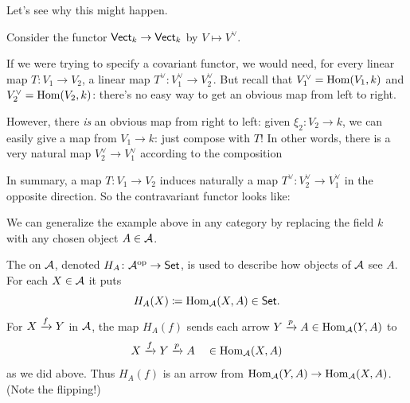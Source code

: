 Let's see why this might happen.
\begin{example}
	Consider the functor $\catname{Vect}_k \to \catname{Vect}_k$ by $V \mapsto V^\vee$.

	If we were trying to specify a covariant functor,
	we would need, for every linear map $T \colon V_1 \to V_2$,
	a linear map $T^\vee \colon V_1^\vee \to V_2^\vee$.
	But recall that $V_1^\vee = \Hom(V_1, k)$ and $V_2^\vee = \Hom(V_2, k)$:
	there's no easy way to get an obvious map from left to right.

	However, there \emph{is} an obvious map from right to left:
	given $\xi_2 \colon V_2 \to k$, we can easily give a map from $V_1 \to k$:
	just compose with $T$!
	In other words, there is a very natural map $V_2^\vee \to V_1^\vee$
	according to the composition
	\begin{center}
	\end{center}
	In summary, a map $T \colon V_1 \to V_2$ induces naturally a map
	$T^\vee \colon V_2^\vee \to V_1^\vee$ in the opposite direction.
	So the contravariant functor looks like:
	\begin{center}
	\end{center}
\end{example}


We can generalize the example above in any category by
replacing the field $k$ with any chosen object $A \in \AA$.

\begin{example}
	The  on $\AA$,
	denoted $H_A \colon \AA\op \to \catname{Set}$,
	is used to describe how objects of $\AA$ see $A$.
	For each $X \in \AA$ it puts \[ H_A(X) \defeq \Hom_{\AA}(X, A) \in \catname{Set}. \]
	For $X \taking{f} Y$ in $\AA$,
	the map $H_A(f)$ sends each arrow $Y \taking{p} A \in \Hom_\AA(Y,A)$ to
	\[ X \taking{f} Y \taking{p} A \quad \in \Hom_\AA(X,A) \]
	as we did above.
	Thus $H_A(f)$ is an arrow from $\Hom_\AA(Y,A) \to \Hom_\AA(X,A)$.
	(Note the flipping!)
\end{example}

